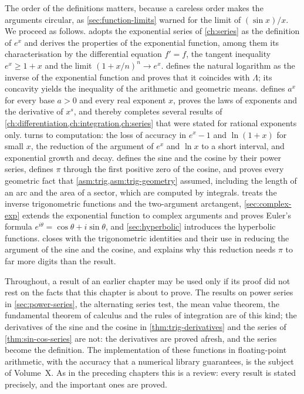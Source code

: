 The order of the definitions matters, because a careless order makes the arguments circular, as \cref{sec:function-limits} warned for the limit of $(\sin x)/x$. We proceed as follows.  adopts the exponential series of \cref{ch:series} as the definition of $e^x$ and derives the properties of the exponential function, among them its characterisation by the differential equation $f'=f$, the tangent inequality $e^x\ge1+x$ and the limit $(1+x/n)^n\to e^x$.  defines the natural logarithm as the inverse of the exponential function and proves that it coincides with $\Lambda$; its concavity yields the inequality of the arithmetic and geometric means.  defines $a^x$ for every base $a>0$ and every real exponent $x$, proves the laws of exponents and the derivative of $x^s$, and thereby completes several results of \cref{ch:differentiation,ch:integration,ch:series} that were stated for rational exponents only.  turns to computation: the loss of accuracy in $e^x-1$ and $\ln(1+x)$ for small $x$, the reduction of the argument of $e^x$ and $\ln x$ to a short interval, and exponential growth and decay.  defines the sine and the cosine by their power series, defines $\pi$ through the first positive zero of the cosine, and proves every geometric fact that \cref{asm:trig,asm:trig-geometry} assumed, including the length of an arc and the area of a sector, which are computed by integrals.  treats the inverse trigonometric functions and the two-argument arctangent, \cref{sec:complex-exp} extends the exponential function to complex arguments and proves Euler's formula $e^{i\theta}=\cos\theta+i\sin\theta$, and \cref{sec:hyperbolic} introduces the hyperbolic functions.  closes with the trigonometric identities and their use in reducing the argument of the sine and the cosine, and explains why this reduction needs $\pi$ to far more digits than the result.

Throughout, a result of an earlier chapter may be used only if its proof did not rest on the facts that this chapter is about to prove. The results on power series in \cref{sec:power-series}, the alternating series test, the mean value theorem, the fundamental theorem of calculus and the rules of integration are of this kind; the derivatives of the sine and the cosine in \cref{thm:trig-derivatives} and the series of \cref{thm:sin-cos-series} are not: the derivatives are proved afresh, and the series become the definition. The implementation of these functions in floating-point arithmetic, with the accuracy that a numerical library guarantees, is the subject of Volume~X. As in the preceding chapters this is a review: every result is stated precisely, and the important ones are proved.

